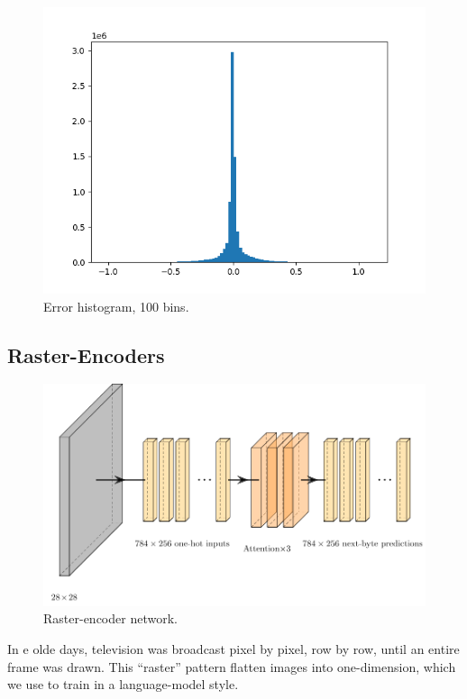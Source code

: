 \documentclass[11pt]{article}
\begin{document}
\begin{figure}[h]
  \centering
  \includegraphics[width=\columnwidth]{diagrams/hist.png}
  \caption{Error histogram, 100 bins.}
  \label{fig:hist}
\end{figure}

\subsection{Raster-Encoders}

\begin{figure}[t]
  \centering
  \includegraphics[width=1.5\columnwidth]{diagrams/raster.pdf}
  \caption{Raster-encoder network.}
  \label{fig:raster}
\end{figure}

In \th e olde days, television was broadcast pixel by pixel, row by row, until an entire frame was drawn. This ``raster'' pattern flatten images into one-dimension, which we use to train in a language-model style.
\end{document}
